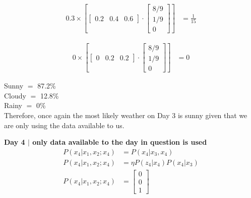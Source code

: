 \documentclass[answers]{exam}
\begin{document}
\begin{questions}
\begin{parts}
\begin{solution}
            \begin{align*}
                0.3 \times \left[\begin{bmatrix} 0.2 & 0.4 & 0.6 \end{bmatrix} \cdot \begin{bmatrix}
                    8/9 \\
                    1/9 \\
                    0
                \end{bmatrix}\right] &= \frac{1}{15}
            \end{align*}

            \begin{align*}
                0 \times \left[\begin{bmatrix} 0 & 0.2 & 0.2 \end{bmatrix} \cdot \begin{bmatrix}
                    8/9 \\
                    1/9 \\
                    0
                \end{bmatrix}\right] &= 0
            \end{align*}

            Sunny $=$ 87.2\% \\
            Cloudy $=$ 12.8\% \\
            Rainy $=$ 0\% \\

            Therefore, once again the most likely weather on Day 3 is sunny given that we are only using the data available to us.

            \textbf{Day 4 $\mid$ only data available to the day in question is used}
            \begin{align*}
                P(x_4 | x_1, x_2;x_4) &= P(x_4 | x_3, x_4) \\
                P(x_4 | x_1, x_2;x_4) &= \eta P(z_4 | x_4)P(x_4 | x_3) \\
                P(x_4 | x_1, x_2;x_4) &= \begin{bmatrix}
                0 \\
                0 \\
                1
                \end{bmatrix}
            \end{align*}


\end{solution}
\end{parts}
\end{questions}
\end{document}
